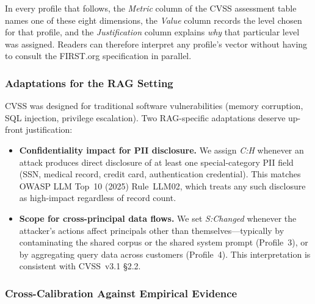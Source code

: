 In every profile that follows, the \emph{Metric} column of the CVSS
assessment table names one of these eight dimensions, the \emph{Value}
column records the level chosen for that profile, and the
\emph{Justification} column explains \emph{why} that particular level
was assigned. Readers can therefore interpret any profile's vector
without having to consult the FIRST.org specification in parallel.

\subsubsection{Adaptations for the RAG Setting}

CVSS was designed for traditional software vulnerabilities (memory
corruption, SQL injection, privilege escalation). Two RAG-specific
adaptations deserve up-front justification:

\begin{itemize}[leftmargin=1.4em, itemsep=3pt]
  \item \textbf{Confidentiality impact for PII disclosure.} We assign
        \emph{C:H} whenever an attack produces direct disclosure of at
        least one special-category PII field (SSN, medical record, credit
        card, authentication credential). This matches OWASP LLM Top~10
        (2025) Rule~LLM02, which treats any such disclosure as
        high-impact regardless of record count.
  \item \textbf{Scope for cross-principal data flows.} We set
        \emph{S:Changed} whenever the attacker's actions affect
        principals other than themselves---typically by contaminating the
        shared corpus or the shared system prompt (Profile~3), or by
        aggregating query data across customers (Profile~4). This
        interpretation is consistent with CVSS~v3.1 \S2.2.
\end{itemize}

\subsubsection{Cross-Calibration Against Empirical Evidence}

